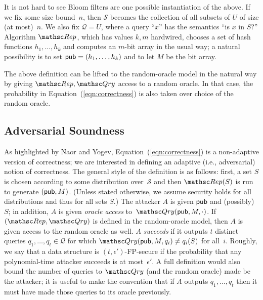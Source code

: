 It is not hard to see Bloom filters are one possible instantiation of the above. If we fix some
size bound~$n$, then $\mathcal{S}$ becomes the collection of all subsets of $U$
of size (at most)~$n$. We also fix $\mathcal{Q} = U$, where a query ``$x$'' has
the semantics ``is $x$ in $S$?'' Algorithm $\Rep$, which has values $k, m$ hardwired,
chooses a set of hash functions $h_1, \ldots, h_k$ and computes an $m$-bit
array in the usual way; a natural possibility is to set ${\sf pub} = (h_1, \ldots, h_k)$ and
to let $M$ be the bit array.  

The above definition can be lifted to the random-oracle model in the natural way
by giving $\Rep, \Qry$ access to a random oracle. In that case,
the probability in Equation~(\ref{eqn:correctness})
is also taken over choice of the random oracle.

\subsection{Adversarial Soundness}
As highlighted by Naor and Yogev,
Equation~(\ref{eqn:correctness}) is a non-adaptive version of correctness;
we are interested in defining an adaptive (i.e., adversarial) notion
of correctness. 
The general style of the definition is as follows:
first, a set $S$ is chosen according to some distribution over~$\mathcal{S}$ and then
$\Rep(S)$ is run to generate $({\sf pub}, M)$. (Unless stated otherwise, we assume
security holds for all distributions and thus for all sets $S$.)
The attacker $A$ is given ${\sf pub}$ and (possibly)~$S$;
in addition, $A$ is given \emph{oracle access} to~$\Qry(\pub, M, \cdot)$.
If $(\Rep, \Qry)$ is defined in the random-oracle model, then
$A$ is given access to the random oracle as well.
$A$ \emph{succeeds} if it outputs $t$ distinct queries $q_1, \ldots, q_t \in \mathcal{Q}$ for which
$\Qry(\pub, M, q_i) \neq q_i(S)$ for all~$i$.
Roughly, we say that a data structure is $(t,\epsilon')$-FP-secure if the probability that
any polynomial-time attacker succeeds is at most~$\epsilon'$. A full definition
would also bound the number of queries to $\Qry$ (and the random oracle) made
be the attacker; it is useful to make the convention that if $A$ outputs
$q_1, \ldots, q_t$ then it must have made those queries to its oracle previously.

